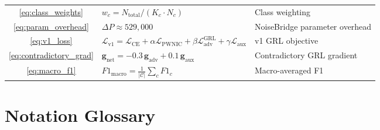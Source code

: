 \documentclass[12pt,a4paper]{report}
\newcommand{\PWNIC}{\mathcal{L}_{\mathrm{PWNIC}}}
\newcommand{\LCE}{\mathcal{L}_{\mathrm{CE}}}
\newcommand{\Laux}{\mathcal{L}_{\mathrm{aux}}}
\begin{document}
\begin{table}[H]
\begin{tabular}{clp{6cm}}
\eqref{eq:class_weights} & $w_c = N_{\text{total}} / (K_c \cdot N_c)$ & Class weighting \\
\eqref{eq:param_overhead} & $\Delta P \approx 529{,}000$ & NoiseBridge parameter overhead \\
\eqref{eq:v1_loss} & $\mathcal{L}_{\text{v1}} = \LCE + \alpha\PWNIC + \beta\mathcal{L}_{\text{adv}}^{\text{GRL}} + \gamma\Laux$ & v1 GRL objective \\
\eqref{eq:contradictory_grad} & $\mathbf{g}_{\text{net}} = -0.3\,\mathbf{g}_{\text{adv}} + 0.1\,\mathbf{g}_{\text{aux}}$ & Contradictory GRL gradient \\
\eqref{eq:macro_f1} & $F1_{\text{macro}} = \frac{1}{|\mathcal{C}|}\sum_c F1_c$ & Macro-averaged F1 \\
\bottomrule
\end{tabular}
\end{table}

\section{Notation Glossary}
\end{document}
